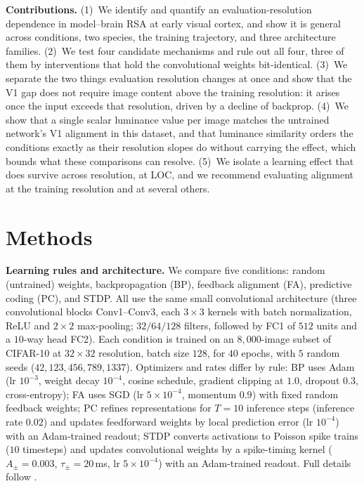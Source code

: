 \documentclass[10pt,twocolumn]{article}
\begin{document}
\textbf{Contributions.} (1)~We identify and quantify an evaluation-resolution dependence in model--brain RSA at early visual cortex, and show it is general across conditions, two species, the training trajectory, and three architecture families. (2)~We test four candidate mechanisms and rule out all four, three of them by interventions that hold the convolutional weights bit-identical. (3)~We separate the two things evaluation resolution changes at once and show that the V1 gap does not require image content above the training resolution: it arises once the input exceeds that resolution, driven by a decline of backprop. (4)~We show that a single scalar luminance value per image matches the untrained network's V1 alignment in this dataset, and that luminance similarity orders the conditions exactly as their resolution slopes do without carrying the effect, which bounds what these comparisons can resolve. (5)~We isolate a learning effect that does survive across resolution, at LOC, and we recommend evaluating alignment at the training resolution and at several others.

\section{Methods}

\textbf{Learning rules and architecture.} We compare five conditions: random (untrained) weights, backpropagation (BP), feedback alignment (FA), predictive coding (PC), and STDP. All use the same small convolutional architecture (three convolutional blocks Conv1--Conv3, each $3\times3$ kernels with batch normalization, ReLU and $2\times2$ max-pooling; $32/64/128$ filters, followed by FC1 of $512$ units and a $10$-way head FC2). Each condition is trained on an $8{,}000$-image subset of CIFAR-10 at $32\times32$ resolution, batch size $128$, for $40$ epochs, with $5$ random seeds ($42, 123, 456, 789, 1337$). Optimizers and rates differ by rule: BP uses Adam (lr $10^{-3}$, weight decay $10^{-4}$, cosine schedule, gradient clipping at $1.0$, dropout $0.3$, cross-entropy); FA uses SGD (lr $5\times10^{-4}$, momentum $0.9$) with fixed random feedback weights; PC refines representations for $T=10$ inference steps (inference rate $0.02$) and updates feedforward weights by local prediction error (lr $10^{-4}$) with an Adam-trained readout; STDP converts activations to Poisson spike trains ($10$ timesteps) and updates convolutional weights by a spike-timing kernel ($A_\pm=0.003$, $\tau_\pm=20$\,ms, lr $5\times10^{-4}$) with an Adam-trained readout. Full details follow \citet{leutenegger2026}.
\end{document}
